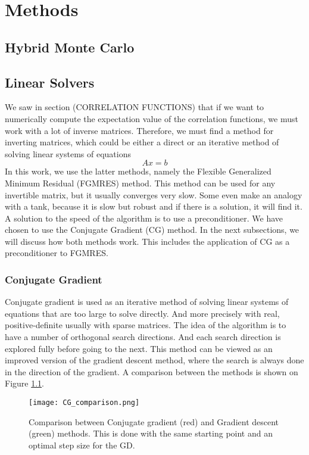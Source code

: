 
\chapter{Methods}
\label{sec:methods}

\section{Hybrid Monte Carlo}

\section{Linear Solvers}

We saw in section (CORRELATION FUNCTIONS) that if we want to numerically compute the expectation value of the correlation functions, we must work with a lot of inverse matrices. Therefore, we must find a method for inverting matrices, which could be either a direct or an iterative method of solving linear systems of equations
\begin{equation}
    Ax = b
    \label{eq:lineq}
\end{equation}
In this work, we use the latter methods, namely the Flexible Generalized Minimum Residual (FGMRES) method. This method can be used for any invertible matrix, but it usually converges very slow. Some even make an analogy with a tank, because it is slow but robust and if there is a solution, it will find it. A solution to the speed of the algorithm is to use a preconditioner. We have chosen to use the Conjugate Gradient (CG) method. In the next subsections, we will discuss how both methods work. This includes the application of CG as a preconditioner to FGMRES.

\subsection{Conjugate Gradient}

Conjugate gradient is used as an iterative method of solving linear systems of equations that are too large to solve directly. And more precisely with real,  positive-definite usually with sparse matrices. The idea of the algorithm is to have a number of orthogonal search directions. And each search direction is explored fully before going to the next. This method can be viewed as an improved version of the gradient descent method, where the search is always done in the direction of the gradient. A comparison between the methods is shown on Figure \ref{fig:cg_comp}.
\begin{figure}[htbp]
    \centerline{\texttt{[image: CG\_comparison.png]}}
    \caption{Comparison between Conjugate gradient (red) and Gradient descent (green) methods. This is done with the same starting point and an optimal step size for the GD.}
    \label{fig:cg_comp}
\end{figure}

